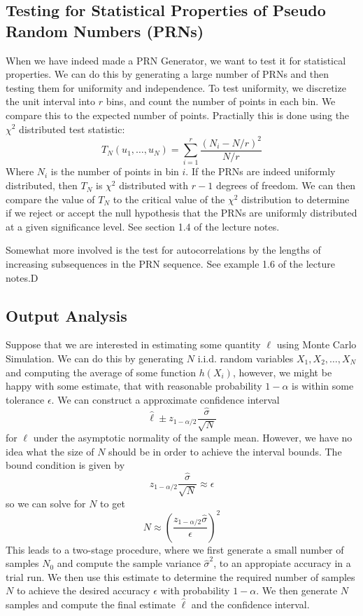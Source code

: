 \documentclass{article}
\theoremstyle{definition}
\theoremstyle{remark}
\begin{document}
\subsection{Testing for Statistical Properties of Pseudo Random Numbers (PRNs)}
When we have indeed made a PRN Generator, we want to test it for statistical properties. We can do this by generating a large number of PRNs and then testing them for uniformity and independence. To test uniformity, we discretize the unit interval into $r$ bins, and count the number of points in each bin. We compare this to the expected number of points. Practially this is done using the $\chi^2$ distributed test statistic:
\begin{equation}
    T_N(u_1, \ldots, u_N) = \sum_{i=1}^{r} \frac{(N_i - N/r)^2}{N/r}
\end{equation}
Where $N_i$ is the number of points in bin $i$. If the PRNs are indeed uniformly distributed, then $T_N$ is $\chi^2$ distributed with $r-1$ degrees of freedom. We can then compare the value of $T_N$ to the critical value of the $\chi^2$ distribution to determine if we reject or accept the null hypothesis that the PRNs are uniformly distributed at a given significance level. See section 1.4 of the lecture notes.

Somewhat more involved is the test for autocorrelations by the lengths of increasing subsequences in the PRN sequence. See example 1.6 of the lecture notes.D

\subsection{Output Analysis}

Suppose that we are interested in estimating some quantity $\ell$ using Monte Carlo Simulation. We can do this by generating $N$ i.i.d. random variables $X_1, X_2, \ldots, X_N$ and computing the average of some function $h(X_i)$, however, we might be happy with some estimate, that with reasonable probability $1-\alpha$ is within some tolerance $\epsilon$. We can construct a approximate confidence interval
\begin{equation}
    \hat{\ell} \pm z_{1-\alpha/2} \frac{\hat{\sigma}}{\sqrt{N}}
\end{equation}
for $\ell$ under the asymptotic normality of the sample mean. However, we have no idea what the size of $N$ should be in order to achieve the interval bounds. The bound condition is given by
\begin{equation}
    z_{1-\alpha/2} \frac{\hat{\sigma}}{\sqrt{N}} \approx \epsilon
\end{equation}
so we can solve for $N$ to get
\begin{equation}
    N \approx \left( \frac{z_{1-\alpha/2} \hat{\sigma}}{\epsilon} \right)^2
\end{equation}
This leads to a two-stage procedure, where we first generate a small number of samples $N_0$ and compute the sample variance $\hat{\sigma}^2$, to an appropiate accuracy in a trial run. We then use this estimate to determine the required number of samples $N$ to achieve the desired accuracy $\epsilon$ with probability $1-\alpha$. We then generate $N$ samples and compute the final estimate $\hat{\ell}$ and the confidence interval.
\end{document}
